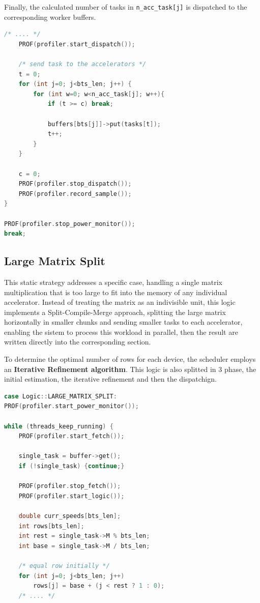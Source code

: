 Finally, the calculated number of tasks in \texttt{n\_acc\_task[j]} is dispatched to the corresponding worker buffers.

\begin{lstlisting}[caption={Static Partitioning: Dispatch}, language=C++] 
    /* .... */
    PROF(profiler.start_dispatch());

    /* send task to the accelerators */
    t = 0;
    for (int j=0; j<bts_len; j++) {
        for (int w=0; w<n_acc_task[j]; w++){
            if (t >= c) break;
            
            buffers[bts[j]]->put(tasks[t]);
            t++;
        }
    }
    
    c = 0; 
    PROF(profiler.stop_dispatch());
    PROF(profiler.record_sample());
} 

PROF(profiler.stop_power_monitor());
break;
\end{lstlisting}

\subsection{Large Matrix Split}
\label{impllargelogic}
This static strategy addresses a specific case, handling a single matrix multiplication that is too large to fit into the memory of any individual accelerator. Instead of treating the matrix as an indivisible unit, this logic implements a Split-Compile-Merge approach, splitting the large matrix horizontally in smaller chunks and sending smaller tasks to each accelerator, enabling the sistem to process this workload in parallel, then the result are written directly into the corresponding section.  

To determine the optimal number of rows for each device, the scheduler employs an \textbf{Iterative Refinement algorithm}. This logic is also splitted in 3 phase, the initial estimation, the iterative refinement and then the dispatchign. 

\begin{lstlisting}[caption={Split Logic: Initialization}, language=C++] 
case Logic::LARGE_MATRIX_SPLIT:
PROF(profiler.start_power_monitor());

while (threads_keep_running) { 
    PROF(profiler.start_fetch());

    single_task = buffer->get();
    if (!single_task) {continue;} 

    PROF(profiler.stop_fetch());
    PROF(profiler.start_logic());

    double curr_speeds[bts_len];
    int rows[bts_len];
    int rest = single_task->M % bts_len;
    int base = single_task->M / bts_len;

    /* equal row initially */
    for (int j=0; j<bts_len; j++) 
        rows[j] = base + (j < rest ? 1 : 0);
    /* .... */
\end{lstlisting}

